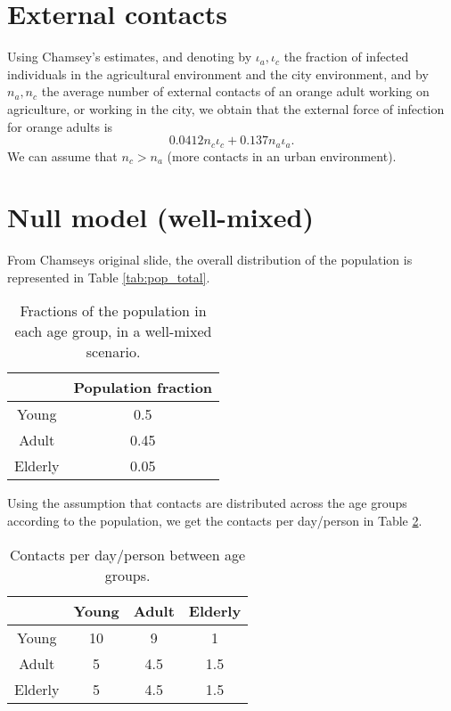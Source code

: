 \documentclass{article}
\begin{document}
\section{External contacts}
Using Chamsey's estimates, and denoting by $\iota_a,\iota_c$ the fraction of
infected individuals in the agricultural environment and the city environment,
and by $n_a,n_c$ the average number of external contacts of an orange adult working on
agriculture, or working in the city, we obtain that the external force of
infection for orange adults is
\[
0.0412 n_c \iota_c + 0.137 n_a \iota_a.
\]
We can assume that $n_c > n_a$ (more contacts in an urban environment).

\section{Null model (well-mixed)}

From Chamseys original slide, the overall distribution of the population is
represented in Table \ref{tab:pop_total}.

\begin{table}[h!]
\begin{center}
\begin{tabular}{ |c|c| } 
 \hline
          & Population fraction\\ 
\hline
Young     & 0.5 \\ 
\hline
Adult     & 0.45 \\ 
\hline
Elderly   & 0.05 \\ 
\hline
\end{tabular}
\caption{Fractions of the population in each age group, in a well-mixed
scenario.}
\label{tab:pop_distro}
\end{center}
\end{table}

Using the assumption that contacts are distributed across the age groups
according to the population, we get the contacts per day/person in Table
\ref{tab:contact_wellmixed}.

\begin{table}[h!]
\begin{center}
\begin{tabular}{ |c|c|c|c| } 
 \hline
          & Young & Adult & Elderly \\ 
\hline
Young     & 10    & 9     & 1       \\ 
\hline
Adult     &  5    & 4.5   & 1.5     \\ 
\hline
Elderly   &  5    & 4.5   & 1.5      \\ 
\hline
\end{tabular}
\caption{Contacts per day/person between age groups.}
\label{tab:contact_wellmixed}
\end{center}
\end{table}
\end{document}
